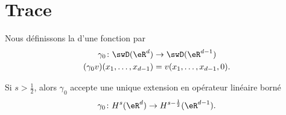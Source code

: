 \section{Trace}

\begin{definition}
	Nous définissons la  d'une fonction par
	\begin{equation}
		\begin{aligned}
			\gamma_0\colon   \swD(\eR^d)     & \to \swD(\eR^{d-1})        \\
			(\gamma_0v)(x_1,\ldots, x_{d-1}) & =v(x_1,\ldots, x_{d-1},0).
		\end{aligned}
	\end{equation}
\end{definition}

\begin{theorem}       \label{THOooXEJZooBKtXBW}
	Si \( s>\frac{ 1 }{2}\), alors \( \gamma_0\) accepte une unique extension en opérateur linéaire borné
	\begin{equation}
		\gamma_0\colon H^s(\eR^d)\to H^{s-\frac{ 1 }{2}}(\eR^{d-1}).
	\end{equation}
\end{theorem}

